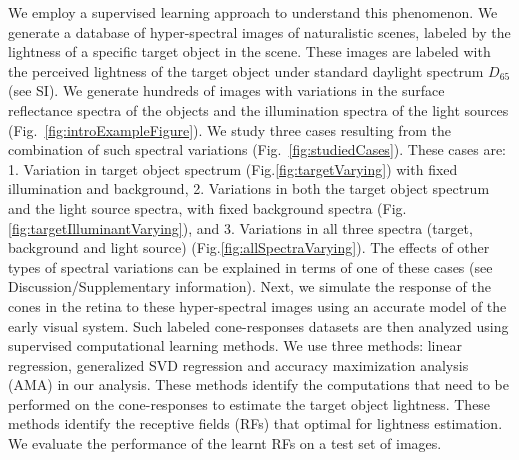 \documentclass{jov}
\begin{document}
We employ a supervised learning approach to understand this phenomenon. We generate a database of hyper-spectral images of naturalistic scenes, labeled by the lightness of a specific target object in the scene. These images are labeled with the perceived lightness of the target object under standard daylight spectrum $D_{65}$ (see SI). We generate hundreds of images with variations in the surface reflectance spectra of the objects and the illumination spectra of the light sources (Fig.~\ref{fig:introExampleFigure}). We study three cases resulting from the combination of such spectral variations (Fig.~\ref{fig:studiedCases}). These cases are: 1. Variation in target object spectrum (Fig.\ref{fig:targetVarying}) with fixed illumination and background, 2. Variations in both the target object spectrum and the light source spectra, with fixed background spectra (Fig.\ref{fig:targetIlluminantVarying}), and 3. Variations in all three spectra (target, background and light source) (Fig.\ref{fig:allSpectraVarying}). The effects of other types of spectral variations can be explained in terms of one of these cases (see Discussion/Supplementary information). Next, we simulate the response of the cones in the retina to these hyper-spectral images using an accurate model of the early visual system. Such labeled cone-responses datasets are then analyzed using supervised computational learning methods. We use three methods: linear regression, generalized SVD regression and accuracy maximization analysis (AMA) in our analysis. These methods identify the computations that need to be performed on the cone-responses to estimate the target object lightness. These methods identify the receptive fields (RFs) that optimal for lightness estimation. We evaluate the performance of the learnt RFs on a test set of images.
\end{document}
